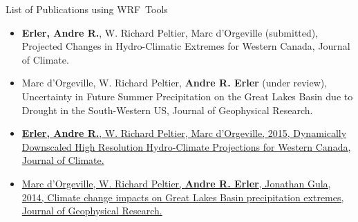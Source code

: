 \documentclass[hyperref={pdfpagelabels=false},compress,final]{beamer}
\begin{document}
\begin{frame}{\Large List of Publications using WRF~Tools}
  \medskip
  \begin{itemize}
    \scriptsize
    \item \textbf{Erler, Andre R.}, W. Richard Peltier, Marc d'Orgeville (submitted),
    Projected Changes in Hydro-Climatic Extremes for Western Canada,
    Journal of Climate. \bigskip

    \item Marc d'Orgeville, W. Richard Peltier, \textbf{Andre R. Erler} (under review),
    Uncertainty in Future Summer Precipitation on the Great Lakes Basin due to Drought in the South-Western US,
    Journal of Geophysical Research. \bigskip

    \item \href{http://journals.ametsoc.org/doi/abs/10.1175/JCLI-D-14-00174.1}
    {\textbf{Erler, Andre R.}, W. Richard Peltier, Marc d'Orgeville, 2015,
      Dynamically Downscaled High Resolution Hydro-Climate Projections for Western Canada,
      Journal of Climate.} \bigskip

    \item \href{http://onlinelibrary.wiley.com/enhanced/doi/10.1002/2014JD021855/}
    {Marc d'Orgeville, W. Richard Peltier, \textbf{Andre R. Erler}, Jonathan Gula, 2014,
      Climate change impacts on Great Lakes Basin precipitation extremes,
      Journal of Geophysical Research.} \bigskip
  \end{itemize}

\end{frame}


\end{document}

